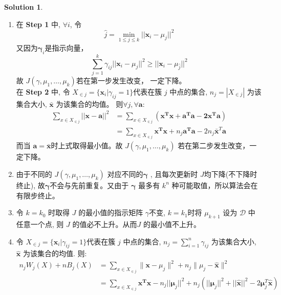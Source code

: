 \documentclass[a4paper,UTF8]{article}
\numberwithin{equation}{section}
\theoremstyle{definition}
\newtheorem*{solution}{Solution}
\begin{document}
\begin{solution} %
\begin{enumerate}[(1)]
\item   在 \textbf{Step 1} 中, $\forall i$, 令 \[ \hat j = \min_{1 \leq j \leq k} ||\mathbf x_i - \mu_j||^2 \]
又因为$\boldsymbol \gamma_i$是指示向量，\[ \sum_{j=1}^k \gamma_{ij}||\mathbf x_i - \mu_j||^2  \geq || \mathbf x_i - \mu_{\hat j}||^2 \]
故 $J(\gamma, \mu_1,\ldots,\mu_k) $若在第一步发生改变， 一定下降。  \\
 在 \textbf{Step 2} 中,  令 $X_{\in j} = \{\mathbf x_i | \gamma_{ij} = 1\}$代表在簇 $j$ 中点的集合, $n_j =|X_{\in j}|$ 为该集合大小, $\bar{ \mathbf x}$ 为该集合的均值。 则$\forall j , \forall \mathbf{a} $:
 \begin{equation}
 \begin{split}
 \sum_{x\in X_{\in j}}  ||\mathbf x - \mathbf{a} ||^2  &=   \sum_{x\in X_{\in j}}  (\mathbf{ x^Tx +  a^Ta - 2 x^Ta  })   \\
 &=  \sum_{x\in X_{\in j}}\mathbf{ x^Tx} +n_j \mathbf{a^Ta} - 2 n_j  {\bar{ \mathbf x}^T\mathbf a} 
 \end{split}
\end{equation}
而当 $\mathbf a =\bar{ \mathbf x}$时上式取得最小值。故 $J(\gamma, \mu_1,\ldots,\mu_k) $ 若在第二步发生改变，一定下降。
\item  %
由于不同的 $J(\gamma, \mu_1,\ldots,\mu_k) $ 对应不同的$\boldsymbol \gamma$ ,  且每次更新时 $J$均下降(不下降时终止),  故$\boldsymbol \gamma$不会与先前重复。又由于 $\boldsymbol \gamma$ 最多有 $k^n$ 种可能取值，所以算法会在有限步终止。\\
\item  %
令 $k = k_0$ 时取得 $J$ 的最小值的指示矩阵 $\gamma$不变,  $k = k_1$时将 $\mu_{k+1}$ 设为 $\mathcal{D}$ 中任意一个点, 则 $J$ 的值必不上升。从而$J$ 的最小值不上升。 \\
\item  %
 令 $X_{\in j} = \{\mathbf x_i | \gamma_{ij} = 1\}$代表在簇 $j$ 中点的集合, $n_j =\sum_{i=1}^n \gamma_{ij}$ 为该集合大小, $\hat{ \mathbf x}$ 为该集合的均值. 则:
  \begin{equation}
 \begin{split}
  n_j W_j(X) + nB_j(X) &=  \sum_{x\in X_{\in j}} \lVert\mathbf x - \mu_j \rVert^2 + {n_j} \lVert\mu_j -\hat{\mathbf x} \rVert^2 \\
  &=  \sum_{x\in X_{\in j}}  {\mathbf{x^Tx}} - n_j ||\boldsymbol \mu_j||^2 +  {n_j}(||\boldsymbol \mu_j||^2 + ||\hat {\mathbf x} || ^ 2 - 2 \boldsymbol \mu_j^T\hat {\mathbf x }) \\

\end{split}
\end{equation}
\end{enumerate}
\end{solution}
\end{document}

